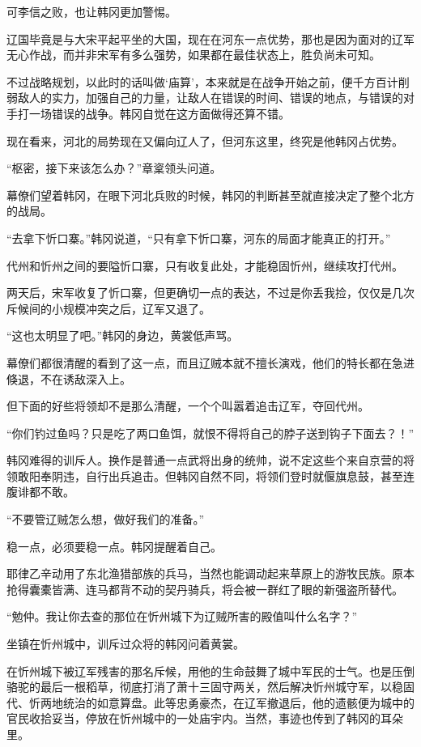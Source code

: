 可李信之败，也让韩冈更加警惕。

辽国毕竟是与大宋平起平坐的大国，现在在河东一点优势，那也是因为面对的辽军无心作战，而并非宋军有多么强势，如果都在最佳状态上，胜负尚未可知。

不过战略规划，以此时的话叫做‘庙算’，本来就是在战争开始之前，便千方百计削弱敌人的实力，加强自己的力量，让敌人在错误的时间、错误的地点，与错误的对手打一场错误的战争。韩冈自觉在这方面做得还算不错。

现在看来，河北的局势现在又偏向辽人了，但河东这里，终究是他韩冈占优势。

“枢密，接下来该怎么办？”章楶领头问道。

幕僚们望着韩冈，在眼下河北兵败的时候，韩冈的判断甚至就直接决定了整个北方的战局。

“去拿下忻口寨。”韩冈说道，“只有拿下忻口寨，河东的局面才能真正的打开。”

代州和忻州之间的要隘忻口寨，只有收复此处，才能稳固忻州，继续攻打代州。

两天后，宋军收复了忻口寨，但更确切一点的表达，不过是你丢我捡，仅仅是几次斥候间的小规模冲突之后，辽军又退了。

“这也太明显了吧。”韩冈的身边，黄裳低声骂。

幕僚们都很清醒的看到了这一点，而且辽贼本就不擅长演戏，他们的特长都在急进倏退，不在诱敌深入上。

但下面的好些将领却不是那么清醒，一个个叫嚣着追击辽军，夺回代州。

“你们钓过鱼吗？只是吃了两口鱼饵，就恨不得将自己的脖子送到钩子下面去？！”

韩冈难得的训斥人。换作是普通一点武将出身的统帅，说不定这些个来自京营的将领敢阳奉阴违，自行出兵追击。但韩冈自然不同，将领们登时就偃旗息鼓，甚至连腹诽都不敢。

“不要管辽贼怎么想，做好我们的准备。”

稳一点，必须要稳一点。韩冈提醒着自己。

耶律乙辛动用了东北渔猎部族的兵马，当然也能调动起来草原上的游牧民族。原本抢得囊橐皆满、连马都背不动的契丹骑兵，将会被一群红了眼的新强盗所替代。

“勉仲。我让你去查的那位在忻州城下为辽贼所害的殿值叫什么名字？”

坐镇在忻州城中，训斥过众将的韩冈问着黄裳。

在忻州城下被辽军残害的那名斥候，用他的生命鼓舞了城中军民的士气。也是压倒骆驼的最后一根稻草，彻底打消了萧十三固守两关，然后解决忻州城守军，以稳固代、忻两地统治的如意算盘。此等忠勇豪杰，在辽军撤退后，他的遗骸便为城中的官民收拾妥当，停放在忻州城中的一处庙宇内。当然，事迹也传到了韩冈的耳朵里。

